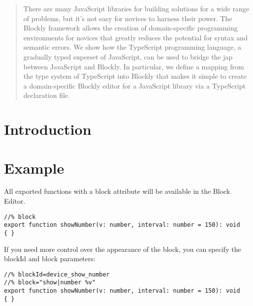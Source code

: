 \documentclass[sigplan,10pt]{acmart}
\begin{document}
\begin{abstract}
  There are many JavaScript libraries for building solutions for a 
  wide range of problems, but it's not easy for novices to harness their power.  
  The Blockly framework allows the creation of domain-specific 
  programming environments for novices that greatly reduces the potential
  for syntax and semantic errors.  We show how the TypeScript
  programming language, a gradually typed superset of JavaScript, can be used
  to bridge the jap between JavaScript and Blockly. In particular, we define
  a mapping from the type system of TypeScript into Blockly that makes it simple
  to create a domain-specific Blockly editor for a JavaScript library via a 
  TypeScript declaration file. 
\end{abstract}




\maketitle

\section{Introduction}

\section{Example}

All exported functions with a block attribute will be available in the Block Editor.

\begin{lstlisting}
//% block
export function showNumber(v: number, interval: number = 150): void
{ }
\end{lstlisting}
If you need more control over the appearance of the block, you can specify the 
blockId and block parameters:
\begin{lstlisting}
//% blockId=device_show_number
//% block="show|number %v"
export function showNumber(v: number, interval: number = 150): void
{ }
\end{lstlisting}
\end{document}
